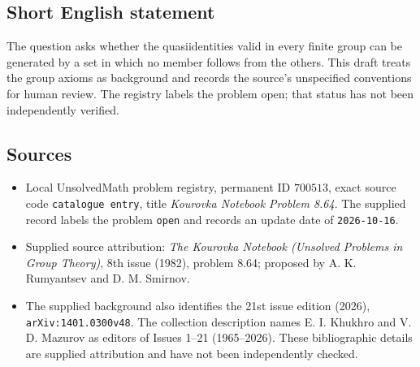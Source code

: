 \documentclass[11pt]{article}
\begin{document}
\subsection{Short English statement}
The question asks whether the quasiidentities valid in every finite group can be generated by a set in which no member follows from the others. This draft treats the group axioms as background and records the source's unspecified conventions for human review. The registry labels the problem open; that status has not been independently verified.
\subsection{Sources}
\begin{itemize}
\item Local UnsolvedMath problem registry, permanent ID \(700513\), exact source code \texttt{catalogue entry}, title \emph{Kourovka Notebook Problem 8.64}. The supplied record labels the problem \texttt{open} and records an update date of \texttt{2026-10-16}.
\item Supplied source attribution: \emph{The Kourovka Notebook (Unsolved Problems in Group Theory)}, 8th issue (1982), problem 8.64; proposed by A. K. Rumyantsev and D. M. Smirnov.
\item The supplied background also identifies the 21st issue edition (2026), \texttt{arXiv:1401.0300v48}. The collection description names E. I. Khukhro and V. D. Mazurov as editors of Issues 1--21 (1965--2026). These bibliographic details are supplied attribution and have not been independently checked.
\end{itemize}
\end{document}
